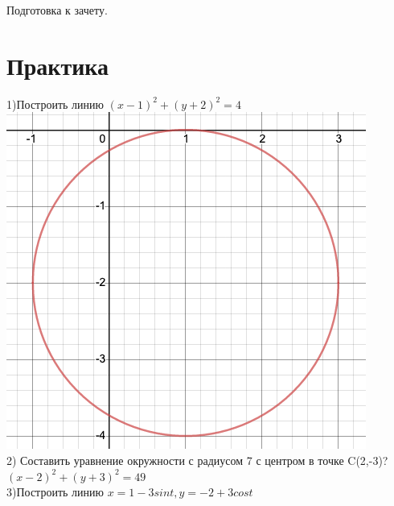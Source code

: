 \documentclass[a4paper]{article}
\begin{document}
    \begin{center} 
        \LARGE Подготовка к зачету.\\
    \end{center}
    \newpage
    \section{Практика}
    1)Построить линию $(x-1)^2+(y+2)^2=4$\\
    \includegraphics[scale=0.3]{e}\\
    2) Составить уравнение окружности с радиусом 7 с центром в точке C(2,-3)?\\
    $(x-2)^2+(y+3)^2=49$\\
    3)Построить линию $x=1-3sint,y=-2+3cost$
\end{document}
